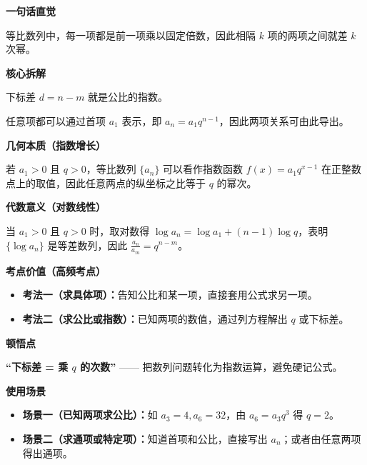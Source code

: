 \begin{explanationbox}

	\textbf{\textcolor{CExplanation}{一句话直觉}}

	等比数列中，每一项都是前一项乘以固定倍数，因此相隔 $k$ 项的两项之间就差 $k$ 次幂。

	\medskip
	\textbf{\textcolor{CExplanation}{核心拆解}}

	\begin{description}[style=nextline, leftmargin=2.8em, labelsep=0.5em, itemsep=0.45em]
		\item[\textbf{要点一（指数关系）：}] 下标差 $d = n-m$ 就是公比的指数。
		\item[\textbf{要点二（首项桥梁）：}] 任意项都可以通过首项 $a_1$ 表示，即 $a_n = a_1 q^{n-1}$，因此两项关系可由此导出。
	\end{description}

	\medskip
	\textbf{\textcolor{CExplanation}{几何本质（指数增长）}}

	若 $a_1>0$ 且 $q>0$，等比数列 $\{a_n\}$ 可以看作指数函数 $f(x)=a_1 q^{x-1}$ 在正整数点上的取值，因此任意两点的纵坐标之比等于 $q$ 的幂次。

	\medskip
	\textbf{\textcolor{CExplanation}{代数意义（对数线性）}}

	当 $a_1>0$ 且 $q>0$ 时，取对数得 $\log a_n = \log a_1 + (n-1)\log q$，表明 $\{\log a_n\}$ 是等差数列，因此 $\frac{a_n}{a_m} = q^{n-m}$。

	\medskip
	\textbf{\textcolor{CExplanation}{考点价值（高频考点）}}

	\begin{itemize}[leftmargin=*, itemsep=0.5em, topsep=0.4em]
		\item \textbf{考法一（求具体项）：}告知公比和某一项，直接套用公式求另一项。
		\item \textbf{考法二（求公比或指数）：}已知两项的数值，通过列方程解出 $q$ 或下标差。
	\end{itemize}

	\medskip
	\textbf{\textcolor{CExplanation}{顿悟点}}

	\textbf{“下标差 = 乘 $q$ 的次数”} —— 把数列问题转化为指数运算，避免硬记公式。

	\medskip
	\textbf{\textcolor{CExplanation}{使用场景}}

	\begin{itemize}[leftmargin=*, itemsep=0.5em, topsep=0.4em]
		\item \textbf{场景一（已知两项求公比）：}如 $a_3=4, a_6=32$，由 $a_6=a_3 q^{3}$ 得 $q=2$。
		\item \textbf{场景二（求通项或特定项）：}知道首项和公比，直接写出 $a_n$；或者由任意两项得出通项。
	\end{itemize}

\end{explanationbox}
